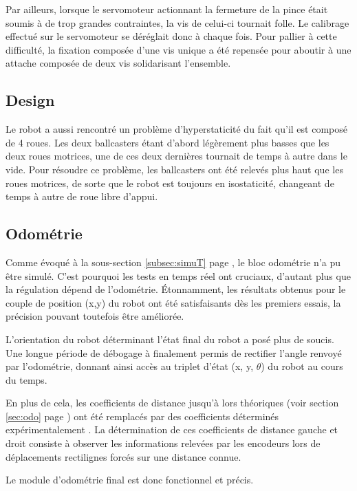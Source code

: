 \documentclass[a4paper,11pt]{article}
\begin{document}
Par ailleurs, lorsque le servomoteur actionnant la fermeture de la pince était soumis à de trop grandes contraintes, la vis de celui-ci tournait folle. Le calibrage effectué sur le servomoteur se déréglait donc à chaque fois. Pour pallier à cette difficulté, la fixation composée d'une vis unique a été repensée pour aboutir à une attache composée de deux vis solidarisant l'ensemble.

\subsection{Design}

Le robot a aussi rencontré un problème d'hyperstaticité du fait qu'il est composé de 4 roues. Les deux ballcasters étant d'abord légèrement plus basses que les deux roues motrices, une de ces deux dernières tournait de temps à autre dans le vide. Pour résoudre ce problème, les ballcasters ont été relevés plus haut que les roues motrices, de sorte que le robot est toujours en isostaticité, changeant de temps à autre de roue libre d'appui.

\subsection{Odométrie}

Comme évoqué à la sous-section \ref{subsec:simuT} page \pageref{subsec:simuT}, le bloc odométrie n'a pu être simulé. C'est pourquoi les tests en temps réel ont cruciaux, d'autant plus que la régulation dépend de l'odométrie. Étonnamment, les résultats obtenus pour le couple de position (x,y) du robot ont été satisfaisants dès les premiers essais, la précision pouvant toutefois être améliorée.

L'orientation du robot déterminant l'état final du robot a posé plus de soucis. Une longue période de débogage à finalement permis de rectifier l'angle renvoyé par l'odométrie, donnant ainsi accès au triplet d'état (x, y, $\theta$) du robot au cours du temps.

En plus de cela, les coefficients de distance jusqu'à lors théoriques (voir section \ref{sec:odo} page \pageref{sec:odo}) ont été remplacés par des coefficients déterminés expérimentalement \cite{guyot_[tutoriel]_2016}. La détermination de ces coefficients de distance gauche et droit consiste à observer les informations relevées par les encodeurs lors de déplacements rectilignes forcés sur une distance connue.

Le module d'odométrie final est donc fonctionnel et précis.
\end{document}
